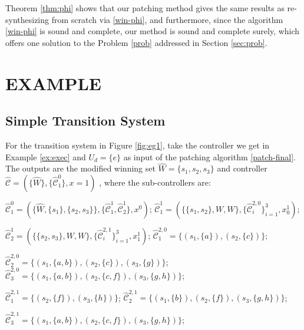  {\color{teal} Theorem \ref{thm:phi} shows that our patching method gives the same results as re-synthesizing from scratch via \eqref{win-phi}, and furthermore, since the algorithm \eqref{win-phi} is sound and complete, our method is sound and complete surely, which offers one solution to the Problem \ref{prob} addressed in Section \ref{sec:prob}.}

\section{EXAMPLE}
\label{sec:example}
\subsection{Simple Transition System}
\label{sec:example1}
For the transition system in Figure \ref{fig:eg1}, take the controller we get in Example \ref{ex:exec} and  $ U_d= \{e\} $ as input of the patching algorithm \eqref{patch-final}. The outputs are the modified winning set $ \widehat{W}=\{s_1,s_2,s_3\} $ and controller $ \widehat{\mathcal{C}} = (\{\widehat{W}\},\{\widehat{\mathcal{C}}_1^0\},x=1) $ , where the sub-controllers are: 

\noindent$ \widehat{\mathcal{C}}^0_1 = (\{\widehat{W},\{s_1\},\{s_2,s_3\}\},\{\widehat{\mathcal{C}}^1_1, \widehat{\mathcal{C}}^1_2\},x^0) $; $ \widehat{\mathcal{C}}^1_1 = (\{\{s_1,s_2\},W,W\},\{\widehat{\mathcal{C}}^{2,0}_i\}_{i=1}^3, x^1_0)$; 

\noindent$ \widehat{\mathcal{C}}^1_2 = (\{\{s_2,s_3\},W,W\},\{\widehat{\mathcal{C}}^{2,1}_i\}_{i=1}^{3}, x^1_1)$; $ \widehat{\mathcal{C}}^{2,0}_1 = \{(s_1,\{a\}),(s_2,\{c\})\} $;

\noindent$ \widehat{\mathcal{C}}^{2,0}_2 = \{(s_1,\{a,b\}),(s_2,\{c\}),(s_3,\{g\})\} $; $ \widehat{\mathcal{C}}^{2,0}_3 = \{(s_1,\{a,b\}),(s_2,\{c,f\}),(s_3,\{g,h\})\} $; 

\noindent$ \widehat{\mathcal{C}}^{2,1}_1 = \{(s_2,\{f\}),(s_3,\{h\})\} $; $ \widehat{\mathcal{C}}^{2,1}_2 = \{(s_1,\{b\}),(s_2,\{f\}), (s_3,\{g,h\})\} $;

\noindent$ \widehat{\mathcal{C}}^{2,1}_3 = \{(s_1,\{a,b\}),(s_2,\{c,f\}),(s_3,\{g,h\})\} $;



